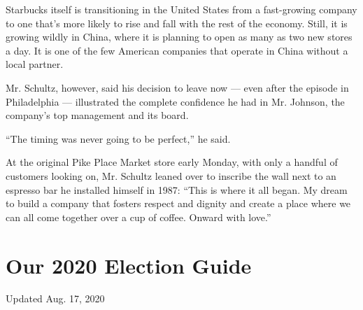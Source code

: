 Starbucks itself is transitioning in the United States from a
fast-growing company to one that's more likely to rise and fall with the
rest of the economy. Still, it is growing wildly in China, where it is
planning to open as many as two new stores a day. It is one of the few
American companies that operate in China without a local partner.

Mr. Schultz, however, said his decision to leave now --- even after the
episode in Philadelphia --- illustrated the complete confidence he had
in Mr. Johnson, the company's top management and its board.

``The timing was never going to be perfect,'' he said.

At the original Pike Place Market store early Monday, with only a
handful of customers looking on, Mr. Schultz leaned over to inscribe the
wall next to an espresso bar he installed himself in 1987: ``This is
where it all began. My dream to build a company that fosters respect and
dignity and create a place where we can all come together over a cup of
coffee. Onward with love.''

\hypertarget{our-2020-election-guide}{%
\section{Our 2020 Election Guide}\label{our-2020-election-guide}}

Updated Aug. 17, 2020

